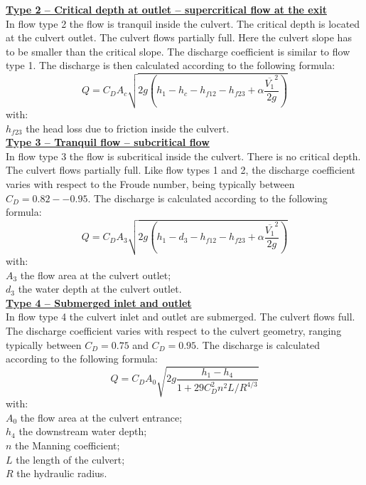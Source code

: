 \underline{\textbf{Type 2 -- Critical depth at outlet – supercritical flow at the exit}}\\

In flow type 2 the flow is tranquil inside the culvert. The critical depth is located at
the culvert outlet. The culvert flows partially full. Here the culvert slope has to be
smaller than the critical slope. The discharge coefficient is similar to flow type 1.
The discharge is then calculated according to the following formula:
\begin{equation}
Q=C_D A_c \sqrt{2g\left(h_1-h_c-h_{f12}-h_{f23}+\alpha \dfrac{\overline{V_1}^2}{2g}\right)}
\end{equation}
with:\\
$h_{f23}$ the head loss due to friction inside the culvert.\\

\underline{\textbf{Type 3 -- Tranquil flow -- subcritical flow}}\\

In flow type 3 the flow is subcritical inside the culvert. There is no critical depth.
The culvert flows partially full. Like flow types 1 and 2, the discharge coefficient
varies with respect to the Froude number, being typically between $C_D=0.82 -- 0.95$.
The discharge is calculated according to the following formula:
\begin{equation}
Q=C_D A_3 \sqrt{2g\left(h_1-d_3-h_{f12}-h_{f23}+\alpha \dfrac{\overline{V_1}^2}{2g}\right)}
\end{equation}
with:\\
$A_3$ the flow area at the culvert outlet;\\
$d_3$ the water depth at the culvert outlet.\\

\underline{\textbf{Type 4 -- Submerged inlet and outlet}}\\

In flow type 4 the culvert inlet and outlet are submerged. The culvert flows full.
The discharge coefficient varies with respect to the culvert geometry, ranging
typically between $C_D=0.75$ and $C_D=0.95$.
The discharge is calculated according to the following formula:
\begin{equation}
Q=C_D A_0 \sqrt{2g\dfrac{h_1-h_4}{1+29C_D^2 n^2 L/R^{4/3}}}
\end{equation}
with:\\
$A_0$ the flow area at the culvert entrance;\\
$h_4$ the downstream water depth;\\
$n$ the Manning coefficient;\\
$L$ the length of the culvert;\\
$R$ the hydraulic radius.\\

